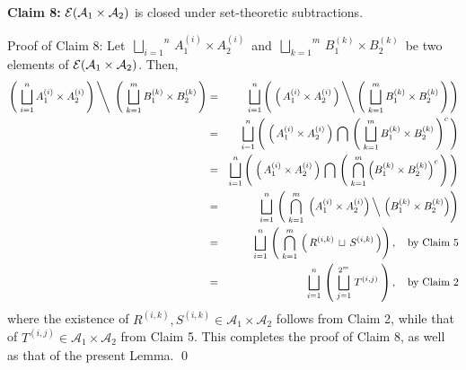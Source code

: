 \vskip 0.5cm
\begin{center}
\begin{minipage}{6.5in}
\textbf{Claim 8:}\quad
$\mathcal{E}\!\left(\mathcal{A}_{1}\times\mathcal{A}_{2}\right)$ is closed under set-theoretic subtractions.
\end{minipage}
\end{center}
Proof of Claim 8:\quad
Let \,$\overset{n}{\underset{i=1}{\bigsqcup}}\,A_{1}^{(i)} \times A_{2}^{(i)}$\,
and 
\,$\overset{m}{\underset{k=1}{\bigsqcup}}\,B_{1}^{(k)} \times B_{2}^{(k)}$\,
be two elements of $\mathcal{E}\!\left(\mathcal{A}_{1}\times\mathcal{A}_{2}\right)$.
Then,
\begin{eqnarray*}
\left.
\left(\;\overset{n}{\underset{i=1}{\bigsqcup}}\,A_{1}^{(i)} \times A_{2}^{(i)}\,\right)
\,\right\backslash\;
\left(\;\overset{m}{\underset{k=1}{\bigsqcup}}\,B_{1}^{(k)} \times B_{2}^{(k)}\,\right)
&=&
	\overset{n}{\underset{i=1}{\bigsqcup}}
	\left(\;
		\left(\,A_{1}^{(i)} \times A_{2}^{(i)}\,\right)
		\left\backslash\,
		\left(\;\overset{m}{\underset{k=1}{\bigsqcup}}\,B_{1}^{(k)} \times B_{2}^{(k)}\,\right)
		\right.
	\right)
\\
&=&
	\overset{n}{\underset{i=1}{\bigsqcup}}
	\left(\;
		\left(\,A_{1}^{(i)} \times A_{2}^{(i)}\,\right)
		\,\bigcap\,
		\left(\;\overset{m}{\underset{k=1}{\bigsqcup}}\,B_{1}^{(k)} \times B_{2}^{(k)}\,\right)^{c}
	\,\right)
\\
&=&
	\overset{n}{\underset{i=1}{\bigsqcup}}
	\left(\;
		\left(\,A_{1}^{(i)} \times A_{2}^{(i)}\,\right)
		\,\bigcap\,
		\left(\;\overset{m}{\underset{k=1}{\bigcap}}\left(B_{1}^{(k)} \times B_{2}^{(k)}\right)^{c}\,\right)
	\,\right)
\\
& = &
	\overset{n}{\underset{i=1}{\bigsqcup}} \,
	\left(\;
		\overset{m}{\underset{k=1}{\bigcap}} \,
		\left.\left(A_{1}^{(i)} \times A_{2}^{(i)}\right)\,\right\backslash\,\left(B_{1}^{(k)} \times B_{2}^{(k)}\right)
	\right)
\\
&=&
	\overset{n}{\underset{i=1}{\bigsqcup}} \,
	\left(\;
		\overset{m}{\underset{k=1}{\bigcap}} \,
		\left(\,R^{(i,k)} \,\sqcup\, S^{(i,k)} \,\right)
	\right),
	\quad\textnormal{by Claim 5}
\\
&=&
	\overset{n}{\underset{i=1}{\bigsqcup}} \,
	\left(\; \overset{2^{m}}{\underset{j=1}{\bigsqcup}} \; T^{(i,j)} \;\right),
	\quad\textnormal{by Claim 2}
\end{eqnarray*}
where the existence of $R^{(i,k)}, S^{(i,k)} \in \mathcal{A}_{1}\times\mathcal{A}_{2}$
follows from Claim 2, while that of
$T^{(i,j)} \in \mathcal{A}_{1}\times\mathcal{A}_{2}$
from Claim 5. This completes the proof of Claim 8, as well as that of the present Lemma.
\qed

